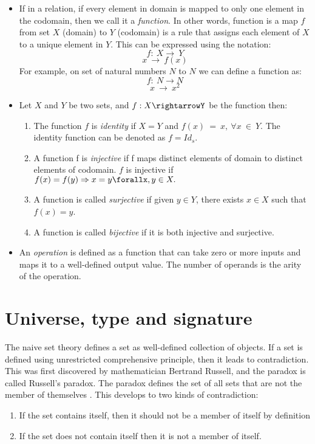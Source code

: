 \begin{itemize}
\item
If in a relation, if every element in domain is mapped to only one element in
the codomain, then we call it a \emph{function}. In other words, function is a
map $f$ from set $X$ (domain) to $Y$ (codomain) is a rule that assigns each
element of $X$ to a unique element in $Y$. This can be expressed using the notation:
\[f:\ X \rightarrow\ Y\]
\[x \ \rightarrow\ f(x)\]
For example, on set of natural numbers $N$ to $N$ we can define a function as:
\[f:\ N \rightarrow N\]
\[x \ \rightarrow\ x^{2}\]   
\item Let $X$ and $Y$ be two sets, and $f:X\rightarrowY$ be the function then:
\begin{enumerate}
    \item The function $f$ is \textit{identity} if $X=Y$ and $f(x)\ =\ x,\ \forall x\ \in
    \ Y$. The identity function can be denoted as $f=Id_s$.
    \item A function f is \emph{injective} if f maps distinct elements of domain to
    distinct elements of codomain. $f$ is injective if $f(x)=f(y) \Rightarrow x = y \forallx,y \in X.$
    \item A function is called \emph{surjective} if given $y \in Y$, there
    exists $x\in X$ such that $f(x) = y$.
    \item A function is called \emph{bijective} if it is both injective and surjective.
\end{enumerate}
\item
An \emph{operation} is defined as a function that can take zero or more inputs
and maps it to a well-defined output value. The number of operands is the arity
of the operation.
\end{itemize}

\section{Universe, type and signature}
The naive set theory defines a set as well-defined collection of objects. If a
set is defined using unrestricted comprehensive
principle\cite{enwiki:1125383109}, then it leads to contradiction. This was
first discovered by mathematician Bertrand Russell, and the paradox is called
Russell's paradox. The paradox defines the set of all sets that are not the
member of themselves \cite{russelPara}. This develops to two kinds of
contradiction:
\begin{enumerate}
\item If the set contains itself, then it should not be a member of itself by
definition
\item If the set does not contain itself then it is not a member of itself.
\end{enumerate}

